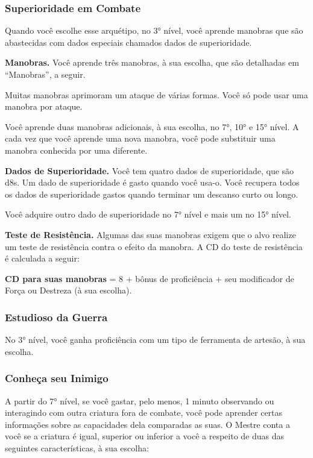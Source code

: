 \documentclass{RPG_Adventure}[2021/10/20]
\begin{document}
\subsubsection{Superioridade em Combate}%
\label{ssub:superioridade_em_combate}

Quando você escolhe esse arquétipo, no 3° nível, você aprende manobras que são
abastecidas com dados especiais chamados dados de superioridade.

\textbf{Manobras.} Você aprende três manobras, à sua escolha, que são detalhadas
em ``Manobras'', a seguir.

Muitas manobras aprimoram um ataque de várias formas.  Você só pode usar uma
manobra por ataque.

Você aprende duas manobras adicionais, à sua escolha, no 7°, 10° e 15° nível. A
cada vez que você aprende uma nova manobra, você pode substituir uma manobra
conhecida por uma diferente.

\textbf{Dados de Superioridade.} Você tem quatro dados de superioridade, que são
d8s. Um dado de superioridade é gasto quando você usa-o. Você recupera todos os
dados de superioridade gastos quando terminar um descanso curto ou longo.

Você adquire outro dado de superioridade no 7° nível e mais um no 15° nível.

\textbf{Teste de Resistência.} Algumas das suas manobras exigem que o alvo
realize um teste de resistência contra o efeito da manobra. A CD do teste de
resistência é calculada a seguir:
\begin{center}
\textbf{CD para suas manobras} = 8 + bônus de proficiência + seu modificador de
Força ou Destreza (à sua escolha).
\end{center}

\subsubsection{Estudioso da Guerra}%
\label{ssub:estudioso_da_guerra}

No 3° nível, você ganha proficiência com um tipo de ferramenta de artesão, à sua
escolha.

\subsubsection{Conheça seu Inimigo}%
\label{ssub:conheca_seu_inimigo}

A partir do 7° nível, se você gastar, pelo menos, 1 minuto observando ou
interagindo com outra criatura fora de combate, você pode aprender certas
informações sobre as capacidades dela comparadas as suas. O Mestre conta a você
se a criatura é igual, superior ou inferior a você a respeito de duas das
seguintes características, à sua escolha:
\end{document}
